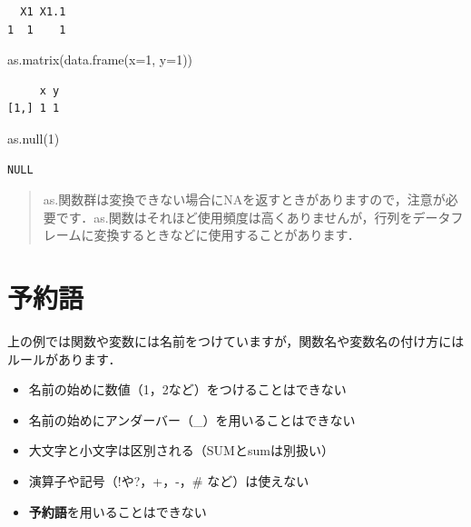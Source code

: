 \documentclass[
  letterpaper,
  DIV=11,
  numbers=noendperiod]{scrreprt}
\newenvironment{Shaded}{\begin{snugshade}}{\end{snugshade}}
\newcommand{\AttributeTok}[1]{\textcolor[rgb]{0.40,0.45,0.13}{#1}}
\newcommand{\DecValTok}[1]{\textcolor[rgb]{0.68,0.00,0.00}{#1}}
\newcommand{\FunctionTok}[1]{\textcolor[rgb]{0.28,0.35,0.67}{#1}}
\newcommand{\NormalTok}[1]{\textcolor[rgb]{0.00,0.23,0.31}{#1}}
\providecommand{\tightlist}{%
  \setlength{\itemsep}{0pt}\setlength{\parskip}{0pt}}\usepackage{longtable,booktabs,array}
\begin{document}
\begin{verbatim}
  X1 X1.1
1  1    1
\end{verbatim}

\begin{Shaded}
\begin{Highlighting}[]
\FunctionTok{as.matrix}\NormalTok{(}\FunctionTok{data.frame}\NormalTok{(}\AttributeTok{x=}\DecValTok{1}\NormalTok{, }\AttributeTok{y=}\DecValTok{1}\NormalTok{))}
\end{Highlighting}
\end{Shaded}

\begin{verbatim}
     x y
[1,] 1 1
\end{verbatim}

\begin{Shaded}
\begin{Highlighting}[]
\FunctionTok{as.null}\NormalTok{(}\DecValTok{1}\NormalTok{)}
\end{Highlighting}
\end{Shaded}

\begin{verbatim}
NULL
\end{verbatim}

\begin{quote}
as.関数群は変換できない場合にNAを返すときがありますので，注意が必要です．as.関数はそれほど使用頻度は高くありませんが，行列をデータフレームに変換するときなどに使用することがあります．
\end{quote}

\hypertarget{ux4e88ux7d04ux8a9e}{%
\section{予約語}\label{ux4e88ux7d04ux8a9e}}

上の例では関数や変数には名前をつけていますが，関数名や変数名の付け方にはルールがあります．

\begin{itemize}
\tightlist
\item
  名前の始めに数値（1，2など）をつけることはできない
\item
  名前の始めにアンダーバー（\_）を用いることはできない
\item
  大文字と小文字は区別される（SUMとsumは別扱い）
\item
  演算子や記号（!や?，+，-，\# など）は使えない
\item
  \textbf{予約語}を用いることはできない
\end{itemize}
\end{document}
